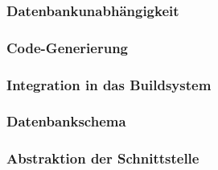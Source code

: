\subsubsection{Datenbankunabhängigkeit}
\subsubsection{Code-Generierung}
\subsubsection{Integration in das Buildsystem}
\subsubsection{Datenbankschema}
\subsubsection{Abstraktion der Schnittstelle}
